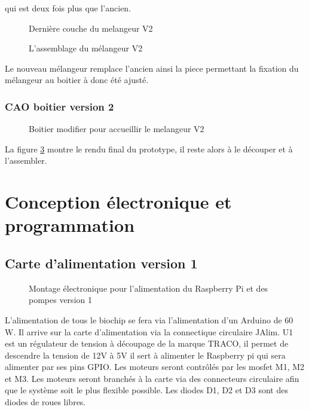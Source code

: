 \documentclass[a4paper, 11pt]{article}
\begin{document}
qui est deux fois plus que l'ancien.
\begin{multicols}{2}
    \begin{figure}[H]
        \centering
        \caption{Dernière couche du melangeur V2}
        \label{fig: CAO_melangeur_V2_couche3}
    \end{figure}
    \begin{figure}[H]
        \centering
        \caption{L'assemblage du mélangeur V2}
        \label{fig:CAO_melangeur_V2}
    \end{figure}
\end{multicols}
Le nouveau mélangeur remplace l'ancien ainsi la piece
permettant la fixation du mélangeur au boitier à donc été ajusté.
\subsubsection{CAO boitier version 2}
\begin{figure}[H]
    \centering
    \caption{Boitier modifier pour accueillir le melangeur V2}
    \label{fig:CAO_boitier_V2}
\end{figure}
La figure \ref{fig:CAO_boitier_V2} montre le rendu final du prototype, il reste alors à le découper et à l'assembler.
\newpage
\section{Conception électronique et programmation}
\subsection{Carte d'alimentation version 1}
\begin{figure}[H]
    \centering
    \caption{Montage électronique pour l'alimentation du Raspberry Pi et des pompes version 1}
    \label{fig:CAO_electronique_V1}
\end{figure}
L'alimentation de tous le biochip se fera via l'alimentation d'un Arduino de 60 W.
Il arrive sur la carte d'alimentation via la connectique circulaire JAlim.
U1 est un régulateur de tension à découpage de la marque TRACO, il permet de descendre la tension de 12V à 5V il sert à alimenter le Raspberry pi qui sera alimenter par ses pins GPIO.
Les moteurs seront contrôlés par les mosfet M1, M2 et M3.
Les moteurs seront branchés à la carte via des connecteurs circulaire afin que le système soit le plus flexible possible.
Les diodes D1, D2 et D3 sont des diodes de roues libres.
\newpage
\end{document}

